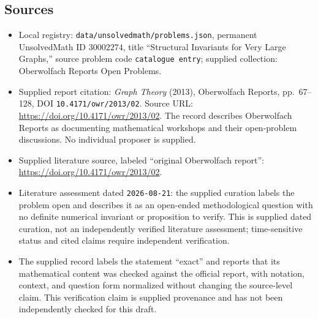 \documentclass[11pt]{article}
\begin{document}
\subsection{Sources}
\begin{itemize}
\item Local registry: \texttt{data/unsolvedmath/problems.json}, permanent UnsolvedMath ID \(30002274\), title ``Structural Invariants for Very Large Graphs,'' source problem code \texttt{catalogue entry}; supplied collection: Oberwolfach Reports Open Problems.
\item Supplied report citation: \emph{Graph Theory} (2013), Oberwolfach Reports, pp.\ 67--128, DOI \texttt{10.4171/owr/2013/02}. Source URL: \url{https://doi.org/10.4171/owr/2013/02}. The record describes Oberwolfach Reports as documenting mathematical workshops and their open-problem discussions. No individual proposer is supplied.
\item Supplied literature source, labeled ``original Oberwolfach report'': \url{https://doi.org/10.4171/owr/2013/02}.
\item Literature assessment dated \texttt{2026-08-21}: the supplied curation labels the problem open and describes it as an open-ended methodological question with no definite numerical invariant or proposition to verify. This is supplied dated curation, not an independently verified literature assessment; time-sensitive status and cited claims require independent verification.
\item The supplied record labels the statement ``exact'' and reports that its mathematical content was checked against the official report, with notation, context, and question form normalized without changing the source-level claim. This verification claim is supplied provenance and has not been independently checked for this draft.
\end{itemize}
\end{document}
